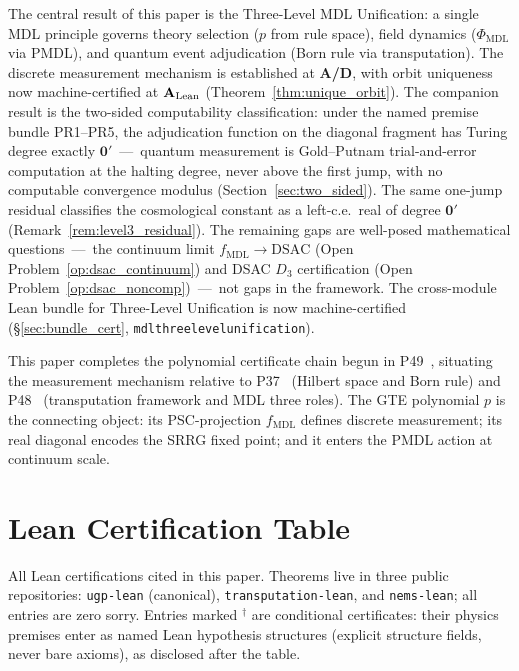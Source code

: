 \documentclass[11pt]{article}
\theoremstyle{remark}
\newcommand{\PHIMDL}{\ensuremath{\Phi_{\mathrm{MDL}}}}
\newcommand{\lean}[1]{%
  \penalty-100
  \begingroup\def\_{\textunderscore\allowbreak}\texttt{#1}\endgroup}
\newcommand{\fmdl}{\ensuremath{f_{\mathrm{MDL}}}}
\newcommand{\DSAC}{\text{DSAC}}
\newcommand{\CatAL}{\ensuremath{\textbf{A}_{\rm Lean}}}
\newcommand{\CatAD}{\textbf{A/D}}
\begin{document}
The central result of this paper is the Three-Level MDL Unification: a single
MDL principle governs theory selection ($p$ from rule space), field dynamics
($\PHIMDL$ via PMDL), and quantum event adjudication (Born rule via
transputation).
The discrete measurement mechanism is established at \CatAD{}, with orbit
uniqueness now machine-certified at \CatAL{}
(Theorem~\ref{thm:unique_orbit}).
The companion result is the two-sided computability classification: under
the named premise bundle PR1--PR5, the adjudication function on the
diagonal fragment has Turing degree exactly $\mathbf{0}'$~---~quantum
measurement is Gold--Putnam trial-and-error computation at the halting
degree, never above the first jump, with no computable convergence modulus
(Section~\ref{sec:two_sided}). The same one-jump residual classifies the
cosmological constant as a left-c.e.\ real of degree $\mathbf{0}'$
(Remark~\ref{rem:level3_residual}).
The remaining gaps are well-posed mathematical questions~---~the continuum
limit $\fmdl{} \to \DSAC$ (Open Problem~\ref{op:dsac_continuum}) and DSAC
$D_3$ certification (Open Problem~\ref{op:dsac_noncomp})~---~not gaps in
the framework. The cross-module Lean bundle for Three-Level Unification is
now machine-certified (\S\ref{sec:bundle_cert}, \lean{mdl\_three\_level\_unification}).

This paper completes the polynomial certificate chain begun in
P49~\cite{SpivackGTEPolynomialWolfram}, situating the measurement mechanism
relative to P37~\cite{SpivackQMFromR110} (Hilbert space and Born rule) and
P48~\cite{SpivackGTECompleteFramework} (transputation framework and MDL
three roles).
The GTE polynomial $p$ is the connecting object: its PSC-projection \fmdl{}
defines discrete measurement; its real diagonal encodes the SRRG fixed point;
and it enters the PMDL action at continuum scale.


\appendix

\section{Lean Certification Table}
\label{app:lean}

All Lean certifications cited in this paper. Theorems live in three public
repositories: \texttt{ugp-lean} (canonical),
\texttt{transputation-lean}, and \texttt{nems-lean}; all entries are zero
sorry. Entries marked $^{\dagger}$ are conditional certificates: their
physics premises enter as named Lean hypothesis structures (explicit
structure fields, never bare axioms), as disclosed after the table.
\end{document}

